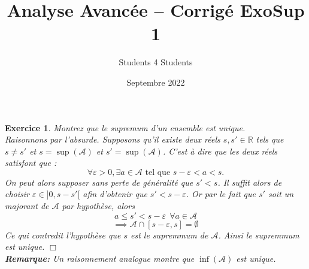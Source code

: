 \documentclass{article}
\title{\textbf{Analyse Avancée -- Corrigé ExoSup 1}}
\author{Students 4 Students}
\date{Septembre 2022}
\newcommand{\Rr}{{\mathbb{R}}}
\theoremstyle{exercice}
\newtheorem{exercice}{Exercice}
\begin{document}
\pagestyle{fancy}

\maketitle

\begin{exercice}
    Montrez que le supremum d'un ensemble est unique.\\

    Raisonnons par l'absurde. Supposons qu'il existe deux réels $s,s' \in \Rr $ tels que $s \ne s'$ et $s = \sup(\mathcal{A} )$ et $s' = \sup (\mathcal{A})$. C'est à dire que les deux réels satisfont que : $$ \forall \varepsilon > 0, \exists a \in \mathcal{A}  \textrm{ tel que } s-\varepsilon < a < s .$$
    On peut alors supposer sans perte de généralité que $s'<s$. Il suffit alors de choisir $\varepsilon \in ]0,s-s'[ $ afin d'obtenir que $s' < s-\varepsilon$. Or par le fait que $s'$ soit un majorant de $\mathcal{A}$ par hypothèse, alors $$
    a \le s' < s- \varepsilon \:\: \forall a \in \mathcal{A}$$
    $$ \implies \mathcal{A} \cap [s-\varepsilon, s] = \emptyset$$ 
    Ce qui contredit l'hypothèse que $s$ est le supremmum de $\mathcal{A}$. Ainsi le supremmum est unique. $\Box$ \\ 
    \textbf{Remarque:} Un raisonnement analogue montre que $\inf (\mathcal{A})$ est unique. 
\end{exercice}
\end{document}
